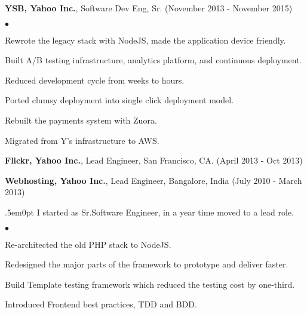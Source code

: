 \documentclass[margin, line, 10pt]{res}
\newenvironment{list2}{
  \begin{list}{$\bullet$}{%
      \setlength{\itemsep}{0in}
      \setlength{\parsep}{0in} \setlength{\parskip}{0in}
      \setlength{\topsep}{0in} \setlength{\partopsep}{0in}
      \setlength{\leftmargin}{0.2in}}}{\end{list}}
\begin{document}
\begin{resume}
{\Large {\bf YSB, Yahoo Inc.}}, Software Dev Eng, Sr. (November 2013 - November 2015)\\
\vspace{-.1cm}
\begin{list2}
\vspace{.1cm}
\item Rewrote the legacy stack with NodeJS, made the application device friendly.
\item Built A/B testing infrastructure, analytics platform, and continuous deployment.
\item Reduced development cycle from weeks to hours.
\item Ported clumsy deployment into single click deployment model.
\item Rebuilt the payments system with Zuora.
\item Migrated from Y’s infrastructure to AWS.
\end{list2}
\vspace{.05cm}

{\Large {\bf Flickr, Yahoo Inc.}}, Lead Engineer, San Francisco, CA.  \hfill (April 2013 - Oct 2013)\\
\vspace{-.1cm}

{\Large {\bf Webhosting, Yahoo Inc.}}, Lead Engineer, Bangalore, India  \hfill (July 2010 - March 2013)\\
\vspace{-.1cm}
\begin{adjustwidth}{.5em}{0pt}
I started as Sr.Software Engineer, in a year time moved to a lead role.\\
\vspace{-.1cm}
\begin{list2}
\vspace{-.3cm}
\item Re-architected the old PHP stack to NodeJS.\\
\vspace{-.3cm}
\item Redesigned the major parts of the framework to prototype and deliver faster.\\
\vspace{-.3cm}
\item Build Template testing framework which reduced the testing cost by one-third.\\
\vspace{-.3cm}
\item Introduced Frontend best practices, TDD and BDD.\\
\end{list2}
\vspace{.05cm}
\end{adjustwidth}


\end{resume}
\end{document}
